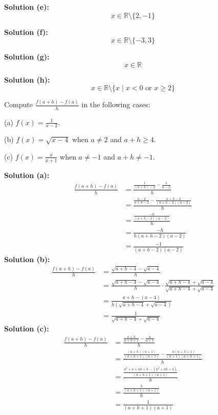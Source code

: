 \textbf{Solution (e):}
\[x \in \mathbb{R} \setminus \{2, -1\}\]

\textbf{Solution (f):}
\[x \in \mathbb{R} \setminus \{-3, 3\}\]

\textbf{Solution (g):}
\[x \in \mathbb{R}\]

\textbf{Solution (h):}
\[x \in \mathbb{R} \setminus \{x \mid x < 0 \text{ or } x \ge 2\}\]

\begin{tcolorbox}[title=Problem 17, breakable]
    Compute $\frac{f(a + h) - f(a)}{h}$
        in the following cases:

    (a) $f(x) = \frac{1}{x - 2}$.

    (b) $f(x) = \sqrt{x - 4}$ when $a \ne 2$ and $a + h \ge 4$.

    (c) $f(x) = \frac{x}{x + 1}$ when $a \ne -1$ and $a + h \ne -1$.
\end{tcolorbox}

\textbf{Solution (a):}
\begin{align*}
    \frac{f(a + h) - f(a)}{h} 
        &= \frac{\frac{1}{(a + h) - 2} - \frac{1}{a - 2}}{h} \\
        &= \frac{\frac{a - 2}{a + h - 2} - \frac{a + h - 2}{(a + h - 2)(a - 2)}}{h} \\
        &= \frac{\frac{-h}{(a + h - 2)(a - 2)}}{h} \\
        &= \frac{-h}{h(a + h - 2)(a - 2)} \\
        &= \frac{-1}{(a + h - 2)(a - 2)}
\end{align*}
\textbf{Solution (b):}
\begin{align*}
    \frac{f(a + h) - f(a)}{h} 
        &= \frac{\sqrt{a + h - 4} - \sqrt{a - 4}}{h} \\
        &= \frac{\sqrt{a + h - 4} - \sqrt{a - 4}}{h} \cdot \frac{\sqrt{a + h - 4} + \sqrt{a - 4}}{\sqrt{a + h - 4} + \sqrt{a - 4}} \\
        &= \frac{a + h - (a - 4)}{h(\sqrt{a + h - 4} + \sqrt{a - 4})} \\
        &= \frac{1}{\sqrt{a + h - 4} + \sqrt{a - 4}}
    \end{align*}
\textbf{Solution (c):}
\begin{align*}
    \frac{f(a + h) - f(a)}{h} 
        &= \frac{\frac{a + h}{a + h + 1} - \frac{a}{a + 1}}{h} \\
        &= \frac{\frac{(a + h)(a + 1)}{(a + h + 1)(a + 1)} - \frac{a(a + h + 1)}{(a + 1)(a + h + 1)}}{h} \\
        &= \frac{\frac{a^2 + a + ah + h - (a^2 + ah + a)}{(a + h + 1)(a + 1)}}{h} \\
        &= \frac{\frac{h}{(a + h + 1)(a + 1)}}{h} \\
        &= \frac{1}{(a + h + 1)(a + 1)}
\end{align*}

